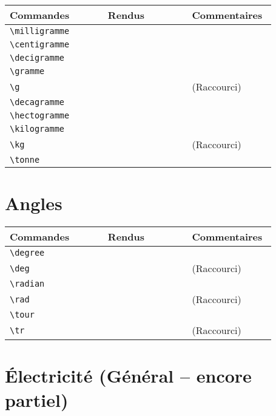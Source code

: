 \documentclass[a4paper,12pt]{article}
\newcommand{\rac}{({\color{red}Raccourci})}
\begin{document}
	\noindent
	\begin{tabular}{|p{0.35\linewidth}|p{0.3\linewidth}|p{0.3\linewidth}|}
		\hline
 			\textbf{Commandes}&\textbf{Rendus}&\textbf{Commentaires}
 		\\\hline\hline
			\verb!\milligramme!	& 	\milligramme	&	\\
		\hline
			\verb!\centigramme!	& 	\centigramme	&	\\
		\hline
			\verb!\decigramme!	& 	\decigramme	&	\\
		\hline
			\verb!\gramme!		& 	\gramme		&	\\
		\hline
			\verb!\g!		& 	\g		&	\rac\\
		\hline
			\verb!\decagramme!	& 	\decagramme	&	\\
		\hline
			\verb!\hectogramme!	& 	\hectogramme		&	\\
		\hline
			\verb!\kilogramme!	& 	\kilogramme		&	\\
		\hline
			\verb!\kg!		& 	\kg		&	\rac\\
		\hline
			\verb!\tonne!		& 	\tonne		&	\\
		\hline
	\end{tabular}
	
	
	\section{Angles}
	
	\noindent
	\begin{tabular}{|p{0.35\linewidth}|p{0.3\linewidth}|p{0.3\linewidth}|}
		\hline
 			\textbf{Commandes}&\textbf{Rendus}&\textbf{Commentaires}
 		\\\hline\hline
			\verb!\degree!	& 	\degree	&	\\
		\hline
			\verb!\deg!	& 	\deg	&	\rac\\
		\hline
			\verb!\radian!	& 	\radian	&	\\
		\hline
			\verb!\rad!	& 	\rad	&	\rac\\
		\hline
			\verb!\tour!	& 	\tour	&	\\
		\hline
			\verb!\tr!	& 	\tr	&	\rac\\
		\hline
	\end{tabular}
	
	\section{Électricité (Général -- encore partiel)}
	
\end{document}
